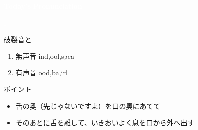 \documentclass[aspectratio=169,xcolor={dvipsnames,table}]{beamer}
\begin{document}
\begin{frame}
\centering
  \textcolor{white}{\Huge\bfseries Today's Pronunciation}\pause

 \vspace{30pt}

  \textcolor{white}{\Huge\bfseries {}, }

\end{frame}
\begin{frame}[plain]{破裂音と}

\large

\begin{enumerate}
 \item  無声音 \hspace{20pt}ind,\hspace{1\zw}ool,\hspace{1\zw}spea
 \item  有声音 \hspace{20pt}ood,\hspace{1\zw}ba,\hspace{1\zw}irl
\end{enumerate}


\vspace*{20pt}

\normalsize
ポイント

\begin{itemize}
 \item 舌の奥（先じゃないですよ）を口の奥にあてて
 \item そのあとに舌を離して、いきおいよく息を口から外へ出す
\end{itemize}

\hfill{}

\end{frame}
\end{document}
